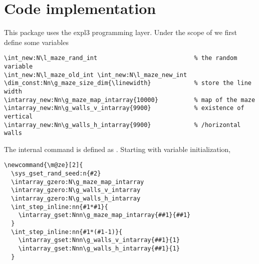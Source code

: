 \documentclass{ltxdoc}
\begin{document}
\section{Code implementation}
This package uses the \textsf{expl3} programming layer. Under the scope of  we first define some variables
\begin{lstlisting}[firstnumber=7]
\int_new:N\l_maze_rand_int                           % the random variable
\int_new:N\l_maze_old_int \int_new:N\l_maze_new_int
\dim_const:Nn\g_maze_size_dim{\linewidth}            % store the line width
\intarray_new:Nn\g_maze_map_intarray{10000}          % map of the maze
\intarray_new:Nn\g_walls_v_intarray{9900}            % existence of vertical
\intarray_new:Nn\g_walls_h_intarray{9900}            % /horizontal walls
\end{lstlisting}

The internal command is defined as . Starting with variable initialization,
\begin{lstlisting}[firstnumber=last]
\newcommand{\m@ze}[2]{
  \sys_gset_rand_seed:n{#2}
  \intarray_gzero:N\g_maze_map_intarray
  \intarray_gzero:N\g_walls_v_intarray
  \intarray_gzero:N\g_walls_h_intarray
  \int_step_inline:nn{#1*#1}{
    \intarray_gset:Nnn\g_maze_map_intarray{##1}{##1}
  }
  \int_step_inline:nn{#1*(#1-1)}{
    \intarray_gset:Nnn\g_walls_v_intarray{##1}{1}
    \intarray_gset:Nnn\g_walls_h_intarray{##1}{1}
  }
\end{lstlisting}
\end{document}
